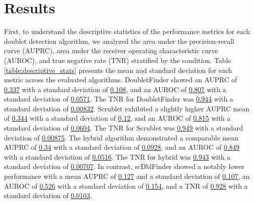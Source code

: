 \documentclass[11pt]{article}
\begin{document}
\section*{Results}

First, to understand the descriptive statistics of the performance metrics for each doublet detection algorithm, we analyzed the area under the precision-recall curve (AUPRC), area under the receiver operating characteristic curve (AUROC), and true negative rate (TNR) stratified by the condition. Table \ref{table:descriptive_stats} presents the mean and standard deviation for each metric across the evaluated algorithms. DoubletFinder showed an AUPRC of \hyperlink{A0a}{0.337} with a standard deviation of \hyperlink{A0b}{0.108}, and an AUROC of \hyperlink{A0c}{0.807} with a standard deviation of \hyperlink{A0d}{0.0571}. The TNR for DoubletFinder was \hyperlink{A0e}{0.944} with a standard deviation of \hyperlink{A0f}{0.00832}. Scrublet exhibited a slightly higher AUPRC mean of \hyperlink{A1a}{0.344} with a standard deviation of \hyperlink{A1b}{0.12}, and an AUROC of \hyperlink{A1c}{0.815} with a standard deviation of \hyperlink{A1d}{0.0604}. The TNR for Scrublet was \hyperlink{A1e}{0.949} with a standard deviation of \hyperlink{A1f}{0.00875}. The hybrid algorithm demonstrated a comparable mean AUPRC of \hyperlink{A2a}{0.34} with a standard deviation of \hyperlink{A2b}{0.0928}, and an AUROC of \hyperlink{A2c}{0.849} with a standard deviation of \hyperlink{A2d}{0.0516}. The TNR for hybrid was \hyperlink{A2e}{0.943} with a standard deviation of \hyperlink{A2f}{0.00707}. In contrast, scDblFinder showed a notably lower performance with a mean AUPRC of \hyperlink{A3a}{0.127} and a standard deviation of \hyperlink{A3b}{0.107}, an AUROC of \hyperlink{A3c}{0.526} with a standard deviation of \hyperlink{A3d}{0.154}, and a TNR of \hyperlink{A3e}{0.928} with a standard deviation of \hyperlink{A3f}{0.0103}.
\end{document}
